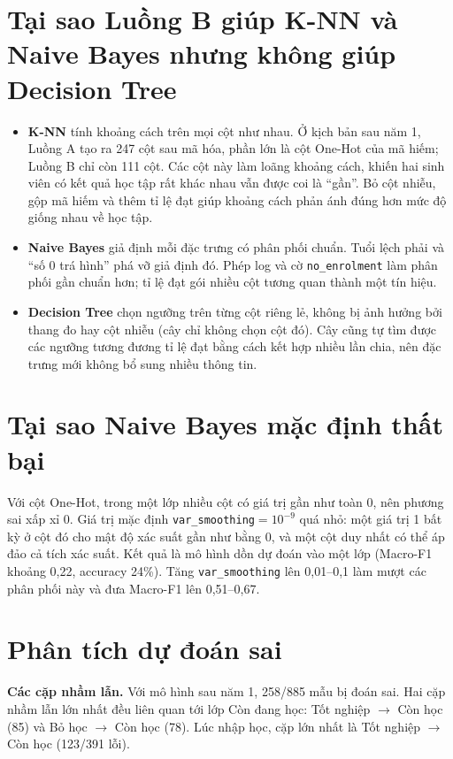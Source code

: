 \documentclass[12pt,a4paper,oneside]{report}
\newcommand{\code}[1]{\texttt{#1}}
\newcommand{\fone}{Macro-F1}
\begin{document}
\section{Tại sao Luồng B giúp K-NN và Naive Bayes nhưng không giúp Decision Tree}
\begin{itemize}
  \item \textbf{K-NN} tính khoảng cách trên mọi cột như nhau. Ở kịch bản sau năm 1, Luồng A tạo ra 247 cột sau mã hóa, phần lớn là cột One-Hot của mã hiếm; Luồng B chỉ còn 111 cột.
        Các cột này làm loãng khoảng cách, khiến hai sinh viên có kết quả học tập rất khác nhau vẫn được coi là ``gần''.
        Bỏ cột nhiễu, gộp mã hiếm và thêm tỉ lệ đạt giúp khoảng cách phản ánh đúng hơn mức độ giống nhau về học tập.
  \item \textbf{Naive Bayes} giả định mỗi đặc trưng có phân phối chuẩn. Tuổi lệch phải và ``số 0 trá hình'' phá vỡ giả định đó.
        Phép log và cờ \code{no\_enrolment} làm phân phối gần chuẩn hơn; tỉ lệ đạt gói nhiều cột tương quan thành một tín hiệu.
  \item \textbf{Decision Tree} chọn ngưỡng trên từng cột riêng lẻ, không bị ảnh hưởng bởi thang đo hay cột nhiễu (cây chỉ không chọn cột đó).
        Cây cũng tự tìm được các ngưỡng tương đương tỉ lệ đạt bằng cách kết hợp nhiều lần chia, nên đặc trưng mới không bổ sung nhiều thông tin.
\end{itemize}

\section{Tại sao Naive Bayes mặc định thất bại}
Với cột One-Hot, trong một lớp nhiều cột có giá trị gần như toàn 0, nên phương sai xấp xỉ 0. Giá trị mặc định
\code{var\_smoothing}$=10^{-9}$ quá nhỏ: một giá trị 1 bất kỳ ở cột đó cho mật độ xác suất gần như bằng 0, và một cột duy nhất
có thể áp đảo cả tích xác suất. Kết quả là mô hình dồn dự đoán vào một lớp (\fone{} khoảng 0,22, accuracy 24\%).
Tăng \code{var\_smoothing} lên 0,01--0,1 làm mượt các phân phối này và đưa \fone{} lên 0,51--0,67.

\section{Phân tích dự đoán sai}
\textbf{Các cặp nhầm lẫn.} Với mô hình sau năm 1, 258/885 mẫu bị đoán sai. Hai cặp nhầm lẫn lớn nhất đều liên quan tới
lớp Còn đang học: Tốt nghiệp $\rightarrow$ Còn học (85) và Bỏ học $\rightarrow$ Còn học (78). Lúc nhập học, cặp lớn nhất là
Tốt nghiệp $\rightarrow$ Còn học (123/391 lỗi).
\end{document}
